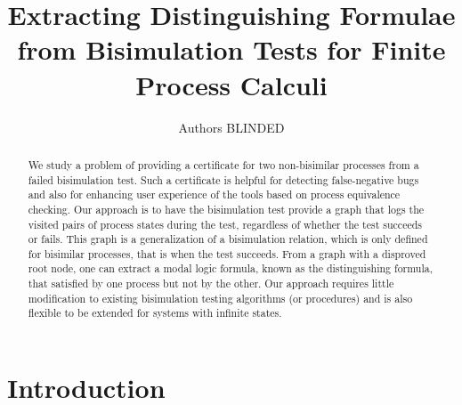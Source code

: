 \documentclass{llncs}
\begin{document}
%
%

\title{Extracting Distinguishing Formulae from Bisimulation Tests for Finite Process Calculi}
%
%
\author{Authors BLINDED %
}
%
%
%

\maketitle              %
\begin{abstract}
We study a problem of providing a certificate for two non-bisimilar processes
from a failed bisimulation test. Such a certificate is helpful for detecting
false-negative bugs and also for enhancing user experience of the tools based
on process equivalence checking. Our approach is to have the bisimulation test
provide a graph that logs the visited pairs of process states during the test,
regardless of whether the test succeeds or fails. This graph is
a generalization of a bisimulation relation, which is only defined for
bisimilar processes, that is when the test succeeds. From a graph with
a disproved root node, one can extract a modal logic formula, known as
the distinguishing formula, that satisfied by one process but not by the other.
Our approach requires little modification to existing bisimulation testing
algorithms (or procedures) and is also flexible to be extended for systems
with infinite states.
\end{abstract}

\section{Introduction}\label{sec:intro}
\end{document}
